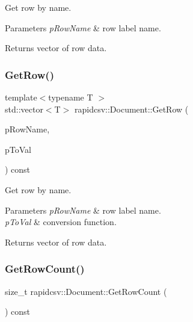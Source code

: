 Get row by name. 


\begin{DoxyParams}{Parameters}
{\em p\+Row\+Name} & row label name. \\
\hline
\end{DoxyParams}
\begin{DoxyReturn}{Returns}
vector of row data. 
\end{DoxyReturn}
\mbox{\label{classrapidcsv_1_1Document_aedfb81004014592afbc900c7bfad5b0b}} 
\subsubsection{\texorpdfstring{Get\+Row()}{GetRow()}\hspace{0.1cm}{\footnotesize\ttfamily [4/4]}}
{\footnotesize\ttfamily template$<$typename T $>$ \\
std\+::vector$<$T$>$ rapidcsv\+::\+Document\+::\+Get\+Row (\begin{DoxyParamCaption}\item[{const std\+::string \&}]{p\+Row\+Name,  }\item[{Conv\+Func$<$ T $>$}]{p\+To\+Val }\end{DoxyParamCaption}) const\hspace{0.3cm}{\ttfamily [inline]}}



Get row by name. 


\begin{DoxyParams}{Parameters}
{\em p\+Row\+Name} & row label name. \\
\hline
{\em p\+To\+Val} & conversion function. \\
\hline
\end{DoxyParams}
\begin{DoxyReturn}{Returns}
vector of row data. 
\end{DoxyReturn}
\mbox{\label{classrapidcsv_1_1Document_af8d77c33b83ceb7d7be284555db1f09f}} 
\subsubsection{\texorpdfstring{Get\+Row\+Count()}{GetRowCount()}}
{\footnotesize\ttfamily size\+\_\+t rapidcsv\+::\+Document\+::\+Get\+Row\+Count (\begin{DoxyParamCaption}{ }\end{DoxyParamCaption}) const\hspace{0.3cm}{\ttfamily [inline]}}



